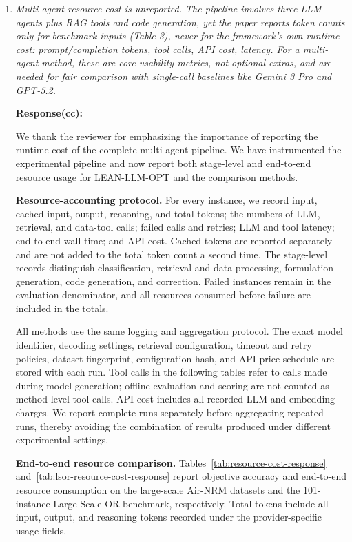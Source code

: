 \documentclass[11pt]{article}
\newcommand{\edit}[1]{{\color{hopkins-blue}\itshape #1}}
\newcommand{\expected}{\noindent\textbf{Expected outputs.} }
\begin{document}
\begin{enumerate}[label=(R2.Major.\arabic*),leftmargin=*]
\expected Complete input- and formulation-scale statistics; controlled
scaling results; solve-time and memory results; and corrected large-scale
terminology and claims.

\item \edit{Multi-agent resource cost is unreported. The pipeline involves three LLM agents plus RAG tools and code generation, yet the paper reports token counts only for benchmark inputs (Table 3), never for the framework's own runtime cost: prompt/completion tokens, tool calls, API cost, latency. For a multi-agent method, these are core usability metrics, not optional extras, and are needed for fair comparison with single-call baselines like Gemini 3 Pro and GPT-5.2.}\label{R2-major-3}

\noindent\textbf{Response(cc):}

We thank the reviewer for emphasizing the importance of reporting the runtime
cost of the complete multi-agent pipeline. We have instrumented the
experimental pipeline and now report both stage-level and end-to-end resource
usage for LEAN-LLM-OPT and the comparison methods.

\medskip
\noindent\textbf{Resource-accounting protocol.}
For every instance, we record input, cached-input, output, reasoning, and total
tokens; the numbers of LLM, retrieval, and data-tool calls; failed calls and
retries; LLM and tool latency; end-to-end wall time; and API cost. Cached
tokens are reported separately and are not added to the total token count a
second time. The stage-level records distinguish classification, retrieval and
data processing, formulation generation, code generation, and correction.
Failed instances remain in the evaluation denominator, and all resources
consumed before failure are included in the totals.

All methods use the same logging and aggregation protocol. The exact model
identifier, decoding settings, retrieval configuration, timeout and retry
policies, dataset fingerprint, configuration hash, and API price schedule are
stored with each run. Tool calls in the following tables refer to calls made
during model generation; offline evaluation and scoring are not counted as
method-level tool calls. API cost includes all recorded LLM and embedding
charges. We report complete runs separately before aggregating repeated runs,
thereby avoiding the combination of results produced under different
experimental settings.

\medskip
\noindent\textbf{End-to-end resource comparison.}
Tables~\ref{tab:resource-cost-response}
and~\ref{tab:lsor-resource-cost-response} report objective accuracy and
end-to-end resource consumption on the large-scale Air-NRM datasets and the
101-instance Large-Scale-OR benchmark, respectively. Total tokens include all
input, output, and reasoning tokens recorded under the provider-specific usage
fields.


\end{enumerate}
\end{document}
